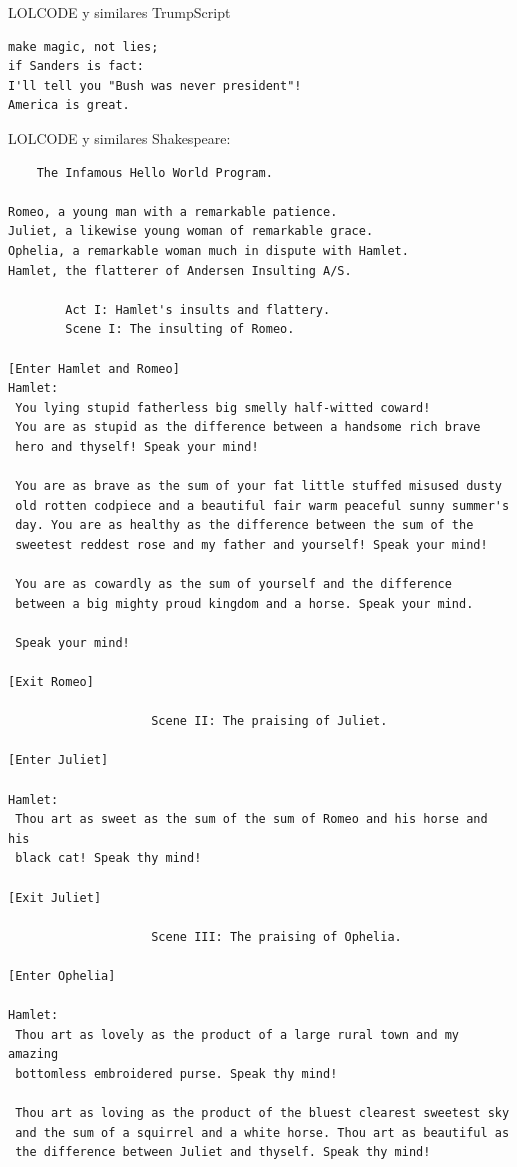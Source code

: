 \documentclass{beamer}
\begin{document}
\begin{frame}[fragile]{LOLCODE y similares}
TrumpScript
\begin{lstlisting}
make magic, not lies;
if Sanders is fact:
I'll tell you "Bush was never president"!
America is great.
\end{lstlisting}
    
\end{frame}

\begin{frame}[fragile]{LOLCODE y similares}
    Shakespeare:
    \begin{lstlisting}
    The Infamous Hello World Program.

Romeo, a young man with a remarkable patience.
Juliet, a likewise young woman of remarkable grace.
Ophelia, a remarkable woman much in dispute with Hamlet.
Hamlet, the flatterer of Andersen Insulting A/S.

        Act I: Hamlet's insults and flattery.
        Scene I: The insulting of Romeo.
        
[Enter Hamlet and Romeo]
Hamlet:
 You lying stupid fatherless big smelly half-witted coward!
 You are as stupid as the difference between a handsome rich brave
 hero and thyself! Speak your mind!

 You are as brave as the sum of your fat little stuffed misused dusty
 old rotten codpiece and a beautiful fair warm peaceful sunny summer's
 day. You are as healthy as the difference between the sum of the
 sweetest reddest rose and my father and yourself! Speak your mind!

 You are as cowardly as the sum of yourself and the difference
 between a big mighty proud kingdom and a horse. Speak your mind.

 Speak your mind!

[Exit Romeo]

                    Scene II: The praising of Juliet.

[Enter Juliet]

Hamlet:
 Thou art as sweet as the sum of the sum of Romeo and his horse and his
 black cat! Speak thy mind!

[Exit Juliet]

                    Scene III: The praising of Ophelia.

[Enter Ophelia]

Hamlet:
 Thou art as lovely as the product of a large rural town and my amazing
 bottomless embroidered purse. Speak thy mind!

 Thou art as loving as the product of the bluest clearest sweetest sky
 and the sum of a squirrel and a white horse. Thou art as beautiful as
 the difference between Juliet and thyself. Speak thy mind!


\end{lstlisting}
\end{frame}
\end{document}
